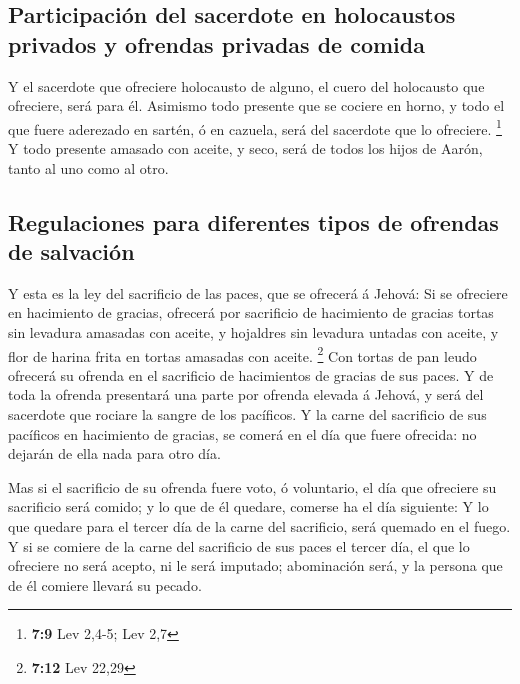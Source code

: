 \hypertarget{participaciuxf3n-del-sacerdote-en-holocaustos-privados-y-ofrendas-privadas-de-comida}{%
\subsection{Participación del sacerdote en holocaustos privados y
ofrendas privadas de
comida}\label{participaciuxf3n-del-sacerdote-en-holocaustos-privados-y-ofrendas-privadas-de-comida}}

 Y el sacerdote que ofreciere holocausto de alguno, el
cuero del holocausto que ofreciere, será para él. 
Asimismo todo presente que se cociere en horno, y todo el que fuere
aderezado en sartén, ó en cazuela, será del sacerdote que lo ofreciere.
\footnote{\textbf{7:9} Lev 2,4-5; Lev 2,7}  Y todo
presente amasado con aceite, y seco, será de todos los hijos de Aarón,
tanto al uno como al otro.

\hypertarget{regulaciones-para-diferentes-tipos-de-ofrendas-de-salvaciuxf3n}{%
\subsection{Regulaciones para diferentes tipos de ofrendas de
salvación}\label{regulaciones-para-diferentes-tipos-de-ofrendas-de-salvaciuxf3n}}

 Y esta es la ley del sacrificio de las paces, que se
ofrecerá á Jehová:  Si se ofreciere en hacimiento de
gracias, ofrecerá por sacrificio de hacimiento de gracias tortas sin
levadura amasadas con aceite, y hojaldres sin levadura untadas con
aceite, y flor de harina frita en tortas amasadas con aceite.
\footnote{\textbf{7:12} Lev 22,29}  Con tortas de pan
leudo ofrecerá su ofrenda en el sacrificio de hacimientos de gracias de
sus paces.  Y de toda la ofrenda presentará una parte por
ofrenda elevada á Jehová, y será del sacerdote que rociare la sangre de
los pacíficos.  Y la carne del sacrificio de sus
pacíficos en hacimiento de gracias, se comerá en el día que fuere
ofrecida: no dejarán de ella nada para otro día.

 Mas si el sacrificio de su ofrenda fuere voto, ó
voluntario, el día que ofreciere su sacrificio será comido; y lo que de
él quedare, comerse ha el día siguiente:  Y lo que
quedare para el tercer día de la carne del sacrificio, será quemado en
el fuego.  Y si se comiere de la carne del sacrificio de
sus paces el tercer día, el que lo ofreciere no será acepto, ni le será
imputado; abominación será, y la persona que de él comiere llevará su
pecado.

